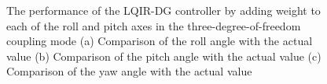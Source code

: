 \documentclass[3p,times]{elsarticle}
\begin{document}
\begin{figure}[!h]
	\centering
	\hfil
	\caption{The performance of the LQIR-DG controller by adding weight to each of the roll and pitch axes in the three-degree-of-freedom coupling mode (a) Comparison of the roll angle with the actual value (b) Comparison of the pitch angle with the actual value (c) Comparison of the yaw angle with the actual value}
	\label{fig:weight}
\end{figure}
\end{document}

